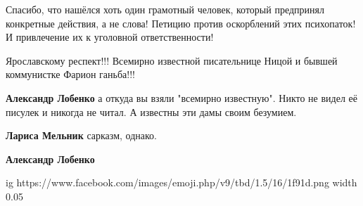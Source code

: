 \begin{itemize}
\begin{itemize}
 

Спасибо, что нашёлся хоть один грамотный человек, который предпринял конкретные
действия, а не слова! Петицию против оскорблений этих психопаток! И привлечение
их к уголовной ответственности!

\end{itemize}

 
Ярославскому респект!!! Всемирно известной писательнице Ницой и бывшей коммунистке Фарион ганьба!!!

\begin{itemize}
 
\textbf{Александр Лобенко} а откуда вы взяли "всемирно известную". Никто не
видел её писулек и никогда не читал. А известны эти дамы своим безумием.

 
\textbf{Лариса Мельник} сарказм, однако.


 
\textbf{Александр Лобенко} 

\ifcmt
  ig https://www.facebook.com/images/emoji.php/v9/tbd/1.5/16/1f91d.png
  width 0.05
\fi

\end{itemize}


\end{itemize}

